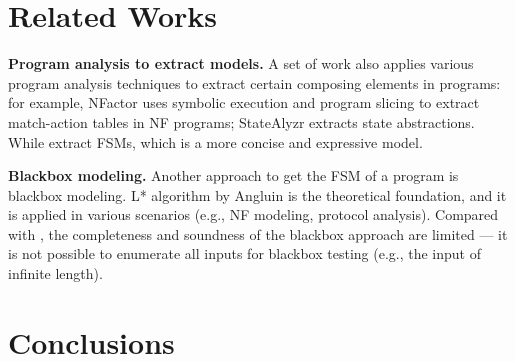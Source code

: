 \section{Related Works}
\textbf{Program analysis to extract models.} A set of work also applies various program analysis techniques to extract certain composing elements in programs: for example, NFactor\cite{wu2016automatic} uses symbolic execution and program slicing to extract match-action tables in NF programs; StateAlyzr\cite{khalid2016paving} extracts state abstractions. While \Tool{} extract FSMs, which is a more concise and expressive model.

\textbf{Blackbox modeling.} Another approach to get the FSM of a program is blackbox modeling. L* algorithm\cite{angluin1987learning} by Angluin is the theoretical foundation, and it is applied in various scenarios (e.g., NF modeling\cite{moon2019alembic}, protocol analysis\cite{cho2011mace}). Compared with \Tool{}, the completeness and soundness of the blackbox approach are limited --- it is not possible to enumerate all inputs for blackbox testing (e.g., the input of infinite length).

\section{Conclusions}